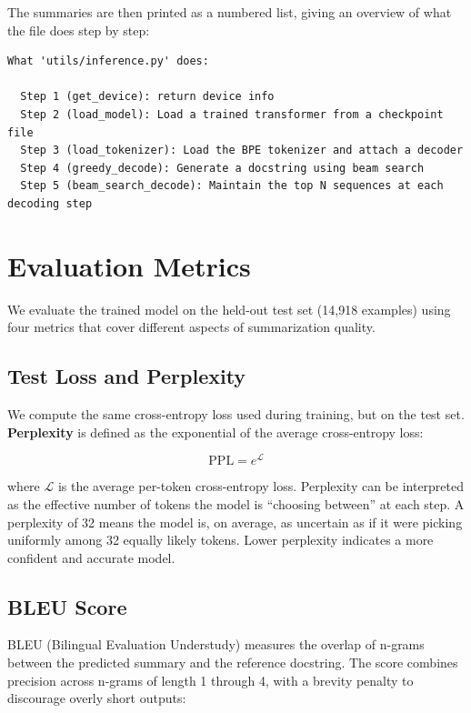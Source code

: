 \documentclass[11pt]{article}
\begin{document}
The summaries are then printed as a numbered list, giving an overview of what the file does step by step:

\begin{lstlisting}[style=plain]
What 'utils/inference.py' does:

  Step 1 (get_device): return device info
  Step 2 (load_model): Load a trained transformer from a checkpoint file
  Step 3 (load_tokenizer): Load the BPE tokenizer and attach a decoder
  Step 4 (greedy_decode): Generate a docstring using beam search
  Step 5 (beam_search_decode): Maintain the top N sequences at each decoding step
\end{lstlisting}

\section{Evaluation Metrics}

We evaluate the trained model on the held-out test set (14,918 examples) using four metrics that cover different aspects of summarization quality.

\subsection{Test Loss and Perplexity}

We compute the same cross-entropy loss used during training, but on the test set. \textbf{Perplexity} is defined as the exponential of the average cross-entropy loss:

\[
\text{PPL} = e^{\mathcal{L}}
\]

where $\mathcal{L}$ is the average per-token cross-entropy loss. Perplexity can be interpreted as the effective number of tokens the model is ``choosing between'' at each step. A perplexity of 32 means the model is, on average, as uncertain as if it were picking uniformly among 32 equally likely tokens. Lower perplexity indicates a more confident and accurate model.

\subsection{BLEU Score}

BLEU (Bilingual Evaluation Understudy) \cite{papineni2002bleu} measures the overlap of n-grams between the predicted summary and the reference docstring. The score combines precision across n-grams of length 1 through 4, with a brevity penalty to discourage overly short outputs:
\end{document}
